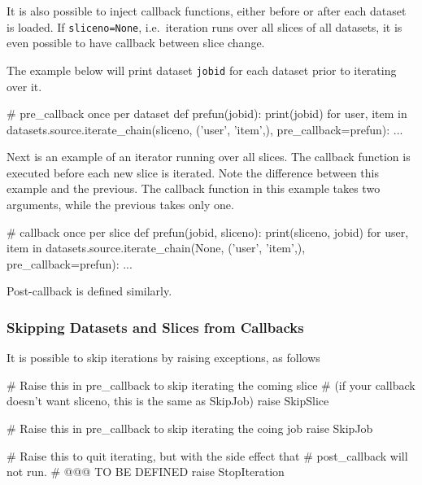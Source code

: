 It is also possible to inject callback functions, either before or
after each dataset is loaded.  If \texttt{sliceno=None},
i.e.\ iteration runs over all slices of all datasets, it is even
possible to have callback between slice change.

The example below will print dataset \texttt{jobid} for each dataset
prior to iterating over it.
\begin{python}
# pre_callback once per dataset
def prefun(jobid):
    print(jobid)
for user, item in datasets.source.iterate_chain(sliceno, ('user', 'item',),
                                       pre_callback=prefun):
    ...
\end{python}
Next is an example of an iterator running over all slices.
The callback function is executed before each new slice is iterated.
Note the difference between this example and the previous.  The
callback function in this example takes two arguments, while the
previous takes only one.

\begin{python}
# callback once per slice
def prefun(jobid, sliceno):
    print(sliceno, jobid)
for user, item in datasets.source.iterate_chain(None, ('user', 'item',),
                                       pre_callback=prefun):
    ...
\end{python}
Post-callback is defined similarly.



\subsubsection*{Skipping Datasets and Slices from Callbacks}
It is possible to skip iterations by raising exceptions, as follows
\begin{python}

# Raise this in pre_callback to skip iterating the coming slice
# (if your callback doesn't want sliceno, this is the same as SkipJob)
raise SkipSlice

# Raise this in pre_callback to skip iterating the coing job
raise SkipJob

# Raise this to quit iterating, but with the side effect that
# post_callback will not run.
# @@@ TO BE DEFINED
raise StopIteration
\end{python}
